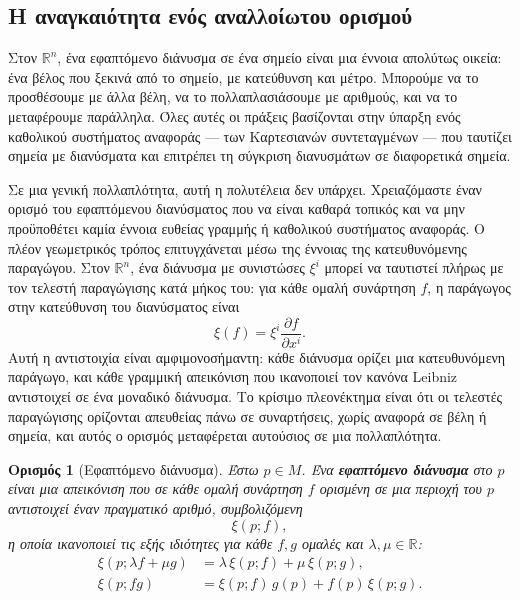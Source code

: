 \documentclass[11pt,a4paper,twoside,openright]{book}
\newtheorem{definition}[lemma]{Ορισμός}
\begin{document}
\subsection{Η αναγκαιότητα ενός αναλλοίωτου ορισμού}


Στον $\mathbb{R}^n$, ένα εφαπτόμενο διάνυσμα σε ένα σημείο είναι μια έννοια απολύτως οικεία: ένα βέλος που ξεκινά από το σημείο, με κατεύθυνση και μέτρο. Μπορούμε να το προσθέσουμε με άλλα βέλη, να το πολλαπλασιάσουμε με αριθμούς, και να το μεταφέρουμε παράλληλα. Όλες αυτές οι πράξεις βασίζονται στην ύπαρξη ενός καθολικού συστήματος αναφοράς --- των Καρτεσιανών συντεταγμένων --- που ταυτίζει σημεία με διανύσματα και επιτρέπει τη σύγκριση διανυσμάτων σε διαφορετικά σημεία.

Σε μια γενική πολλαπλότητα, αυτή η πολυτέλεια δεν υπάρχει. Χρειαζόμαστε έναν ορισμό του εφαπτόμενου διανύσματος που να είναι καθαρά τοπικός και να μην προϋποθέτει καμία έννοια ευθείας γραμμής ή καθολικού συστήματος αναφοράς. Ο πλέον γεωμετρικός τρόπος επιτυγχάνεται μέσω της έννοιας της κατευθυνόμενης παραγώγου. Στον $\mathbb{R}^n$, ένα διάνυσμα με συνιστώσες $\xi^i$ μπορεί να ταυτιστεί πλήρως με τον τελεστή παραγώγισης κατά μήκος του: για κάθε ομαλή συνάρτηση $f$, η παράγωγος στην κατεύθυνση του διανύσματος είναι
\begin{equation}
\xi(f) = \xi^i \frac{\partial f}{\partial x^i}.
\end{equation}
Αυτή η αντιστοιχία είναι αμφιμονοσήμαντη: κάθε διάνυσμα ορίζει μια κατευθυνόμενη παράγωγο, και κάθε γραμμική απεικόνιση που ικανοποιεί τον κανόνα Leibniz αντιστοιχεί σε ένα μοναδικό διάνυσμα. Το κρίσιμο πλεονέκτημα είναι ότι οι τελεστές παραγώγισης ορίζονται απευθείας πάνω σε συναρτήσεις, χωρίς αναφορά σε βέλη ή σημεία, και αυτός ο ορισμός μεταφέρεται αυτούσιος σε μια πολλαπλότητα.

\begin{definition}[Εφαπτόμενο διάνυσμα]
Έστω $p \in M$. Ένα \textbf{εφαπτόμενο διάνυσμα} στο $p$ είναι μια απεικόνιση που σε κάθε ομαλή συνάρτηση $f$ ορισμένη σε μια περιοχή του $p$ αντιστοιχεί έναν πραγματικό αριθμό, συμβολιζόμενη
\[
\xi(p; f),
\]
η οποία ικανοποιεί τις εξής ιδιότητες για κάθε $f, g$ ομαλές και $\lambda, \mu \in \mathbb{R}$:
\begin{align}
\xi(p; \lambda f + \mu g) &= \lambda \, \xi(p; f) + \mu \, \xi(p; g), \\[2pt]
\xi(p; f g) &= \xi(p; f) \, g(p) + f(p) \, \xi(p; g).
\end{align}
\end{definition}
\end{document}
